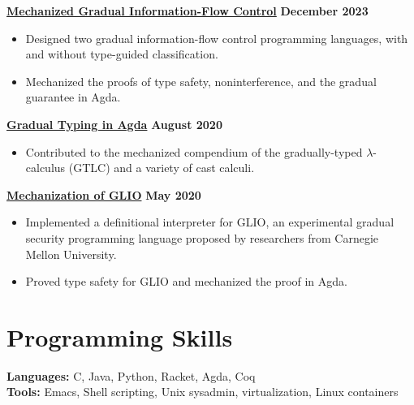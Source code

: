 {\bf \href{https://github.com/Gradual-Typing/LambdaIFCStar}{Mechanized Gradual Information-Flow Control}}
\hfill {\bf December 2023}
\begin{itemize}
\item Designed two gradual information-flow control programming languages,
  with and without type-guided classification.
\item Mechanized the proofs of type safety, noninterference, and the gradual
  guarantee in Agda.
\end{itemize}
{\bf \href{https://github.com/jsiek/gradual-typing-in-agda}{Gradual Typing in Agda}}
\hfill {\bf August 2020}
\begin{itemize}
\item Contributed to the mechanized compendium of the gradually-typed
  $\lambda$-calculus (GTLC) and a variety of cast calculi.
\end{itemize}
{\bf \href{https://github.com/Gradual-Typing/lambda-sec/tree/master/glio}{Mechanization of GLIO}}
\hfill {\bf May 2020}
\begin{itemize}
\item Implemented a definitional interpreter for GLIO, an experimental
  gradual security programming language proposed by researchers from Carnegie
  Mellon University.
\item Proved type safety for GLIO and mechanized the proof in Agda.
\end{itemize}


\section*{\sc Programming Skills}

{\bf Languages: } C, Java, Python, Racket, Agda, Coq \\
{\bf Tools: } Emacs, Shell scripting, Unix sysadmin, virtualization, Linux containers

